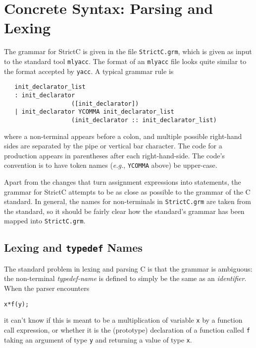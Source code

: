 \documentclass{article}
\newcommand{\strictc}{\textsf{StrictC}}
\newcommand{\srcfile}[1]{\texttt{#1}}
\newcommand{\eg}{\textit{e.g.}}
\begin{document}

\appendix
\section{Concrete Syntax: Parsing and Lexing}
\label{sec:grammar}

The grammar for \strictc{} is given in the file \srcfile{StrictC.grm}, which
is given as input to the standard tool \texttt{mlyacc}.  The format of
an \texttt{mlyacc} file looks quite similar to the format accepted by
\texttt{yacc}.  A typical grammar rule is
\begin{verbatim}
   init_declarator_list
   : init_declarator
                   ([init_declarator])
   | init_declarator YCOMMA init_declarator_list
                   (init_declarator :: init_declarator_list)
\end{verbatim}
where a non-terminal appears before a colon, and multiple possible
right-hand sides are separated by the pipe or vertical bar character.
The code for a production appears in parentheses after each
right-hand-side.  The code's convention is to have token names (\eg,
\texttt{YCOMMA} above) be upper-case.

Apart from the changes that turn assignment expressions into
statements, the grammar for \strictc{} attempts to be as close as
possible to the grammar of the C standard.  In general, the names for
non-terminals in \srcfile{StrictC.grm} are taken from the standard, so it
should be fairly clear how the standard's grammar has been mapped into
\srcfile{StrictC.grm}.

\subsection{Lexing and \texttt{typedef} Names}
\label{sec:lexing-typedefs}

The standard problem in lexing and parsing C is that the grammar is
ambiguous: the non-terminal \textit{typedef-name} is defined to simply
be the same as an \textit{identifier}.  When the parser encounters
\begin{alltt}
   x * f(y);
\end{alltt}
it can't know if this is meant to be a multiplication of variable
\texttt{x} by a function call expression, or whether it is the
(prototype) declaration of a function called \texttt{f} taking an
argument of type \texttt{y} and returning a value of type \texttt{x}.
\end{document}

